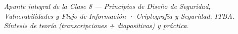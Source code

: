 \documentclass[11pt,a4paper]{article}
\begin{document}
\vfill
\begin{center}\small\itshape\color{black!60}
Apunte integral de la Clase 8 — Principios de Diseño de Seguridad, Vulnerabilidades y Flujo de
Información · Criptografía y Seguridad, ITBA.\\
Síntesis de teoría (transcripciones + diapositivas) y práctica.
\end{center}
\end{document}
